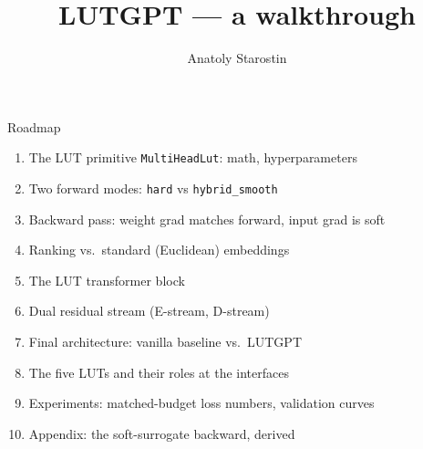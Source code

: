 \documentclass[aspectratio=169]{beamer}
\title{LUTGPT --- a walkthrough}
\author{Anatoly Starostin}
\date{}
\begin{document}
\frame{\titlepage}

\begin{frame}{Roadmap}
\begin{enumerate}
\item The LUT primitive \texttt{MultiHeadLut}: math, hyperparameters
\item Two forward modes: \texttt{hard} vs \texttt{hybrid\_smooth}
\item Backward pass: weight grad matches forward, input grad is soft
\item Ranking vs.\ standard (Euclidean) embeddings
\item The LUT transformer block
\item Dual residual stream (E-stream, D-stream)
\item Final architecture: vanilla baseline vs.\ LUTGPT
\item The five LUTs and their roles at the interfaces
\item Experiments: matched-budget loss numbers, validation curves
\item Appendix: the soft-surrogate backward, derived
\end{enumerate}
\end{frame}
\end{document}
